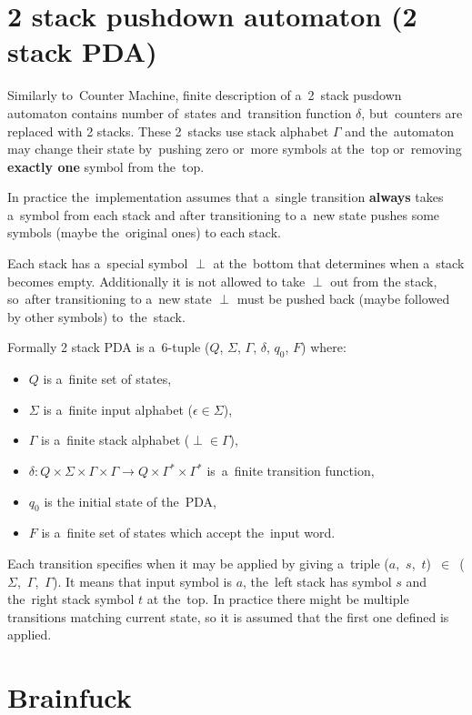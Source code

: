\documentclass[english,shortabstract,mgr]{iithesis}
\begin{document}
\section {2 stack pushdown automaton (2 stack PDA)}

Similarly to~Counter Machine, finite description of a~2~stack pusdown automaton contains
number of~states and~transition function $\delta$, but~counters are replaced with 2 stacks.
These 2~stacks use stack alphabet $\Gamma$ and the~automaton may change their state
by~pushing zero or~more symbols at the~top or~removing \textbf{exactly one} symbol from
the~top.

In practice the~implementation assumes that a~single transition \textbf{always} takes
a~symbol from each stack and after transitioning to a~new state pushes some symbols
(maybe the~original ones) to each stack.

Each stack has a~special symbol $\perp$ at the~bottom that determines when a~stack becomes
empty. Additionally it is not allowed to take $\perp$ out from the stack, so~after transitioning
to a~new state $\perp$ must be pushed back (maybe followed by other symbols) to~the~stack.

Formally 2 stack PDA is a~$6$-tuple ($Q$, $\Sigma$, $\Gamma$, $\delta$, $q_0$, $F$) where:
\begin{itemize}
  \item $Q$ is a~finite set of states,
  \item $\Sigma$ is a~finite input alphabet ($\epsilon \in \Sigma$),
  \item $\Gamma$ is a~finite stack alphabet ($\perp \in \Gamma$),
  \item $\delta: Q \times \Sigma \times \Gamma \times \Gamma \rightarrow
      Q \times \Gamma^* \times \Gamma^*$ is~a~finite transition function,
  \item $q_0$ is the initial state of the~PDA,
  \item $F$ is a~finite set of states which accept the~input word.
\end{itemize}

Each transition specifies when it may be applied by giving a~triple
($a$,~$s$,~$t$)~$\in$~($\Sigma$,~$\Gamma$,~$\Gamma$). It means that input symbol is $a$,
the~left stack has symbol $s$ and the~right stack symbol $t$ at the~top. In practice there
might be multiple transitions matching current state, so it is assumed that the first one
defined is applied.

\section{Brainfuck}
\end{document}
